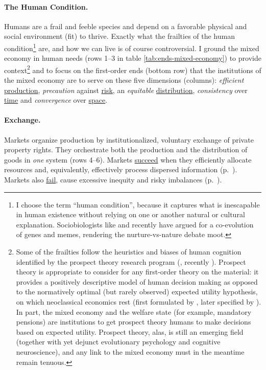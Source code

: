 
	

\paragraph{The Human Condition.} \label{sec:human-condition}  Humans are a frail and feeble species and depend on a favorable physical and social environment (fit) to thrive. Exactly what the frailties of the human condition\footnote{
	\label{fn:humancondition}I choose the term ``human condition'', because it captures what is inescapable in human existence without relying on one or another natural or cultural explanation. Sociobiologists like \cite{Boyd1985} and recently \cite{Henrich2007} have argued for a co-evolution of genes and memes, rendering the nurture-vs-nature debate moot.}
are, and how we can live is of course controversial. I ground the mixed economy in human needs (rows 1--3 in table \ref{tab:ends-mixed-economy}) to provide context\footnote{
	Some of the frailties follow the heuristics and biases of human cognition identified by the prospect theory research program (\citealt{Kahneman1979}, recently \citealt{Kahneman2011}). Prospect theory is appropriate to consider for any first-order theory on the material: it provides a positively descriptive model of human decision making as opposed to the normatively optimal (but rarely observed) expected utility hypothesis, on which neoclassical economics rest (first formulated by \citealt{Bernoulli1738}, later specified by \citealt{VonNeumann1944}). In part, the mixed economy and the welfare state (for example, mandatory pensions) are institutions to get prospect theory humans to make decisions based on expected utility. Prospect theory, alas, is still an emerging field (together with yet dejunct evolutionary psychology and cognitive neuroscience), and any link to the mixed economy must in the meantime remain tenuous.}
and to focus on the first-order ends (bottom row) that the institutions of the mixed economy are to serve on these five dimensions (columns): \emph{efficient} \hyperref[sec:production]{production}, \emph{precaution} against \hyperref[sec:risk]{risk}, an \emph{equitable} \hyperref[sec:distribution]{distribution}, \emph{consistency} over \hyperref[sec:time]{time} and \emph{convergence} over \hyperref[sec:space]{space}.

\paragraph[Exchange]{Exchange.}  \label{sec:exchange}
Markets organize production by institutionalized, voluntary exchange of private property rights. They orchestrate both the production and the distribution of goods in \emph{one} system (rows 4--6). Markets \hyperref[sec:market-solutions-production]{succeed} when they efficiently allocate resources and, equivalently, effectively process dispersed information (p.~\pageref{sec:market-solutions-production}). Markets also \hyperref[sec:market-failures]{fail}, cause excessive inequity and risky imbalances (p.~\pageref{sec:market-failures}).

